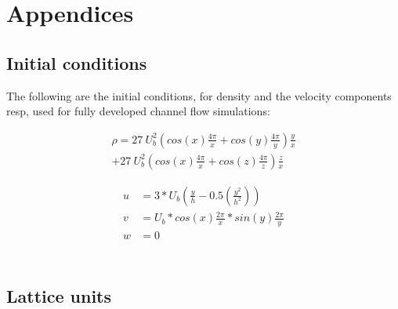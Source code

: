 \newpage

\appendix

\section{Appendices}

\subsection{Initial conditions} \label{I.C}

The following are the initial conditions, for density and the velocity components resp, used for fully developed channel flow simulations:

\begin{multline}
\rho = 27\ U_b^2 \left( cos\left(x\right) \frac{4\pi}{x} + cos\left(y\right) \frac{4\pi}{y}\right) \frac{y}{x} \\+  27\ U_b^2 \left( cos\left(x\right) \frac{4\pi}{x} + cos\left(z\right) \frac{4\pi}{z}\right) \frac{z}{x}
\end{multline}

\begin{equation}
\label{Initial conditions}
\begin{split}
u &= 3* U_b \left(\frac{y}{h} - 0.5\left(\frac{y^2}{h^2}\right)\right)\\
v &= U_b* cos\left(x\right)\frac{2\pi}{x}*sin\left(y\right)\frac{2\pi}{y} \\
w &= 0\\
\end{split}
\end{equation}\\
\label{Initial condition}


\subsection{Lattice units} \label{Mach number explanation}

